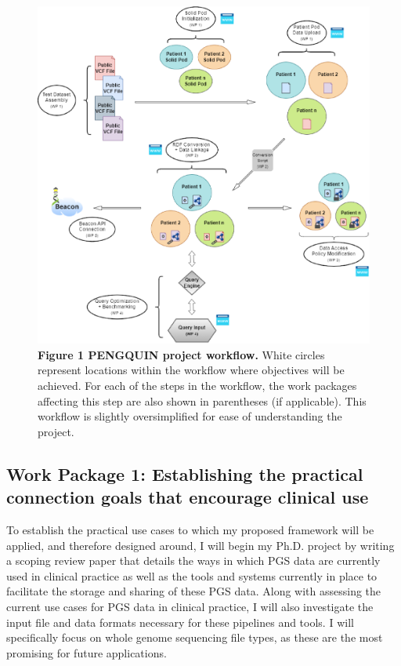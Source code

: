 \documentclass[runningheads]{llncs}
\begin{document}
\begin{figure}
\includegraphics[width=\textwidth]{fig1.eps}
\caption{\textbf{Figure 1 PENGQUIN project workflow.}
White circles represent locations within the workflow where objectives will be achieved. 
For each of the steps in the workflow, the work packages affecting this step are also shown in parentheses (if applicable). 
This workflow is slightly oversimplified for ease of understanding the project.
} \label{fig1}
\end{figure}

\subsection{Work Package 1: Establishing the practical connection goals that encourage clinical use}

To establish the practical use cases to which my proposed framework will be applied, and therefore designed around, I will begin my Ph.D. project by writing a scoping review paper that details the ways in which PGS data are currently used in clinical practice as well as the tools and systems currently in place to facilitate the storage and sharing of these PGS data. 
Along with assessing the current use cases for PGS data in clinical practice, I will also investigate the input file and data formats necessary for these pipelines and tools. 
I will specifically focus on whole genome sequencing file types, as these are the most promising for future applications. 
\end{document}
